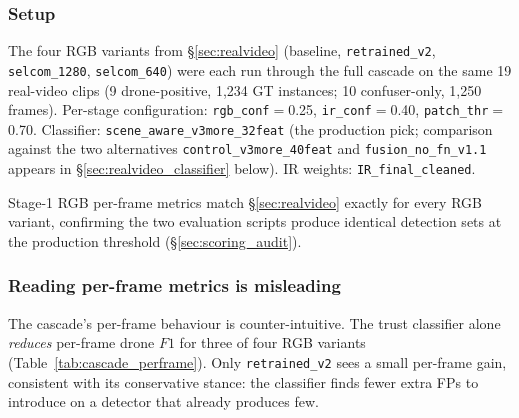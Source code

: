 \subsubsection{Setup}
The four RGB variants from \S\ref{sec:realvideo} (baseline, \texttt{retrained\_v2}, \texttt{selcom\_1280}, \texttt{selcom\_640}) were each run through the full cascade on the same 19 real-video clips (9 drone-positive, 1{,}234 GT instances; 10 confuser-only, 1{,}250 frames). Per-stage configuration: \texttt{rgb\_conf}$=$0.25, \texttt{ir\_conf}$=$0.40, \texttt{patch\_thr}$=$0.70. Classifier: \texttt{scene\_aware\_v3more\_32feat} (the production pick; comparison against the two alternatives \texttt{control\_v3more\_40feat} and \texttt{fusion\_no\_fn\_v1.1} appears in \S\ref{sec:realvideo_classifier} below). IR weights: \texttt{IR\_final\_cleaned}.

Stage-1 RGB per-frame metrics match \S\ref{sec:realvideo} exactly for every RGB variant, confirming the two evaluation scripts produce identical detection sets at the production threshold (\S\ref{sec:scoring_audit}).

\subsubsection{Reading per-frame metrics is misleading}

The cascade's per-frame behaviour is counter-intuitive. The trust classifier alone \emph{reduces} per-frame drone $F1$ for three of four RGB variants (Table~\ref{tab:cascade_perframe}). Only \texttt{retrained\_v2} sees a small per-frame gain, consistent with its conservative stance: the classifier finds fewer extra FPs to introduce on a detector that already produces few.

